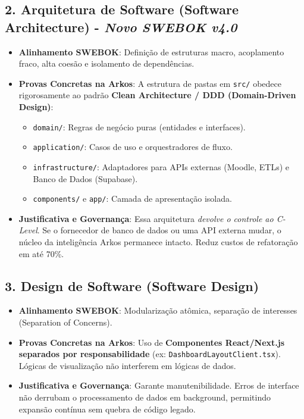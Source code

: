 \subsection{2. Arquitetura de Software (Software Architecture) - \textit{Novo SWEBOK v4.0}}
\begin{itemize}
    \item \textbf{Alinhamento SWEBOK}: Definição de estruturas macro, acoplamento fraco, alta coesão e isolamento de dependências.
    \item \textbf{Provas Concretas na Arkos}: A estrutura de pastas em \texttt{src/} obedece rigorosamente ao padrão \textbf{Clean Architecture / DDD (Domain-Driven Design)}:
        \begin{itemize}
            \item \texttt{domain/}: Regras de negócio puras (entidades e interfaces).
            \item \texttt{application/}: Casos de uso e orquestradores de fluxo.
            \item \texttt{infrastructure/}: Adaptadores para APIs externas (Moodle, ETLs) e Banco de Dados (Supabase).
            \item \texttt{components/} e \texttt{app/}: Camada de apresentação isolada.
        \end{itemize}
    \item \textbf{Justificativa e Governança}: Essa arquitetura \textit{devolve o controle ao C-Level}. Se o fornecedor de banco de dados ou uma API externa mudar, o núcleo da inteligência Arkos permanece intacto. Reduz custos de refatoração em até 70\%.
\end{itemize}

\subsection{3. Design de Software (Software Design)}
\begin{itemize}
    \item \textbf{Alinhamento SWEBOK}: Modularização atômica, separação de interesses (Separation of Concerns).
    \item \textbf{Provas Concretas na Arkos}: Uso de \textbf{Componentes React/Next.js separados por responsabilidade} (ex: \texttt{DashboardLayoutClient.tsx}). Lógicas de visualização não interferem em lógicas de dados.
    \item \textbf{Justificativa e Governança}: Garante manutenibilidade. Erros de interface não derrubam o processamento de dados em background, permitindo expansão contínua sem quebra de código legado.
\end{itemize}

